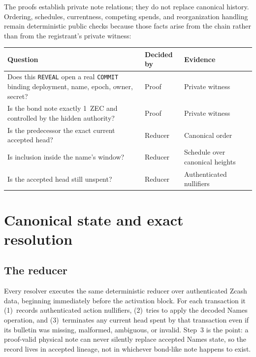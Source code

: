 \documentclass[11pt]{article}
\newcommand{\operation}[1]{\texttt{#1}}
\begin{document}
The proofs establish private note relations; they do not replace canonical
history. Ordering, schedules, currentness, competing spends, and
reorganization handling remain deterministic public checks because those
facts arise from the chain rather than from the registrant's private witness:

\begin{center}
\small
\begin{tabular}{>{\raggedright\arraybackslash}p{}>{\raggedright\arraybackslash}p{}>{\raggedright\arraybackslash}p{}}
\toprule
Question & Decided by & Evidence \\
\midrule
Does this \operation{REVEAL} open a real \operation{COMMIT} binding deployment, name, epoch, owner, secret? & Proof & Private witness \\
Is the bond note exactly 1~ZEC and controlled by the hidden authority? & Proof & Private witness \\
Is the predecessor the exact current accepted head? & Reducer & Canonical order \\
Is inclusion inside the name's window? & Reducer & Schedule over canonical heights \\
Is the accepted head still unspent? & Reducer & Authenticated nullifiers \\
\bottomrule
\end{tabular}
\end{center}

\section{Canonical state and exact resolution}
\label{sec:resolution}

\subsection{The reducer}

Every resolver executes the same deterministic reducer over authenticated
Zcash data, beginning immediately before the activation block. For each
transaction it (1)~records authenticated action nullifiers, (2)~tries to
apply the decoded Names operation, and (3)~terminates any current head spent
by that transaction even if its bulletin was missing, malformed, ambiguous,
or invalid. Step~3 is the point: a proof-valid physical note can never
silently replace accepted Names state, so the record lives in accepted
lineage, not in whichever bond-like note happens to exist.
\end{document}
